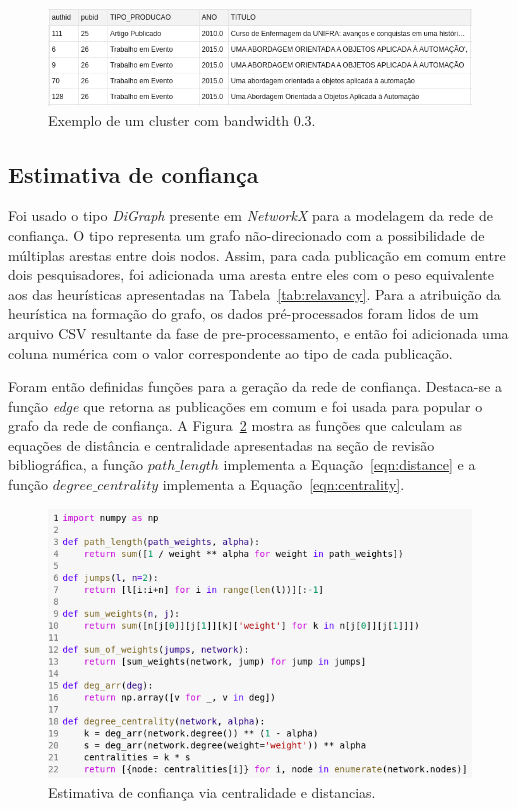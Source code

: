 \documentclass[12pt]{article}
\begin{document}
\begin{figure}[ht]
\centering
  \includegraphics[width=1\textwidth]{shared-03-cluster.png}
  \caption{Exemplo de um cluster com bandwidth 0.3.}
  \label{fig:cluster03}
\end{figure}

\subsection{Estimativa de confiança}

Foi usado o tipo \textit{DiGraph} presente em \textit{NetworkX} para a modelagem da rede de confiança. O tipo representa um grafo não-direcionado com a possibilidade de múltiplas arestas entre dois nodos. Assim, para cada publicação em comum entre dois pesquisadores, foi adicionada uma aresta entre eles com o peso equivalente aos das heurísticas apresentadas na Tabela~\ref{tab:relavancy}. Para a atribuição da heurística na formação do grafo, os dados pré-processados foram lidos de um arquivo CSV resultante da fase de pre-processamento, e então foi adicionada uma coluna numérica com o valor correspondente ao tipo de cada publicação. 

Foram então definidas funções para a geração da rede de confiança. Destaca-se a função \textit{edge} que retorna as publicações em comum e foi usada para popular o grafo da rede de confiança.
A Figura~\ref{fig:trust-estimative-code-centrality-distances} mostra as funções que calculam as equações de distância e centralidade apresentadas na seção de revisão bibliográfica, a função $path\_length$ implementa a Equação~\ref{eqn:distance} e a função $degree\_centrality$ implementa a Equação~\ref{eqn:centrality}.

\begin{figure}[ht]
  \centering
  \includegraphics[width=.7\textwidth]{trustest_code_c.png}
  \caption{Estimativa de confiança via centralidade e distancias.}
  \label{fig:trust-estimative-code-centrality-distances}
\end{figure}
\end{document}
